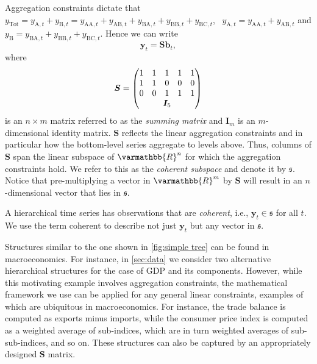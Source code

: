\documentclass[graybox]{svmult}
\begin{document}
Aggregation constraints dictate that $y_{\text{Tot}}=y_{\text{A},t}+y_{\text{B},t}=y_{\text{AA},t}+y_{\text{AB},t}+y_{\text{BA},t}+y_{\text{BB},t}+y_{\text{BC},t}$,~ $y_{\text{A},t}=y_{\text{AA},t}+y_{\text{AB},t}$ and $y_{\text{B}}=y_{\text{BA},t}+y_{\text{BB},t}+y_{\text{BC},t}$. Hence we can write
\begin{equation}\label{eq:summing matrix}
	\bm{y}_t = \bm{Sb}_t,
\end{equation}
where \begin{equation*}
	\bm{S} = \begin{pmatrix}
		1 & 1                            & 1 & 1 & 1 \\
		1 & 1                            & 0 & 0 & 0 \\
		0 & 0                            & 1 & 1 & 1 \\
		  & \multicolumn{3}{c}{\bm{I}_5} &
	\end{pmatrix}
\end{equation*}
is an $n\times m$ matrix referred to as the \textit{summing matrix} and $\bm{I}_m$ is an $m$-dimensional identity matrix. $\bm{S}$ reflects the linear aggregation constraints and in particular how the bottom-level series aggregate to levels above. Thus, columns of $\bm{S}$ span the linear subspace of $\varmathbb{R}^n$ for which the aggregation constraints hold. We refer to this as the \textit{coherent subspace} and denote it by $\mathfrak{s}$. Notice that pre-multiplying a vector in $\varmathbb{R}^m$ by $\bm{S}$ will result in an $n$-dimensional vector that lies in $\mathfrak{s}$.

\begin{property}
	A hierarchical time series has observations that are \textit{coherent}, i.e., $\bm{y}_{t} \in \mathfrak{s}$ for all $t$. We use the term coherent to describe not just $\bm{y}_t$ but any vector in $\mathfrak{s}$.
	\label{prop:coherence}
\end{property}

Structures similar to the one shown in \autoref{fig:simple tree} can be found in macroeconomics. For instance, in \autoref{sec:data} we consider two alternative hierarchical structures for the case of GDP and its components. However, while this motivating example involves aggregation constraints, the mathematical framework we use can be applied for any general linear constraints, examples of which are ubiquitous in macroeconomics. For instance, the trade balance is computed as exports minus imports, while the consumer price index is computed as a weighted average of sub-indices, which are in turn weighted averages of sub-sub-indices, and so on. These structures can also be captured by an appropriately designed $\bm{S}$ matrix.
\end{document}
